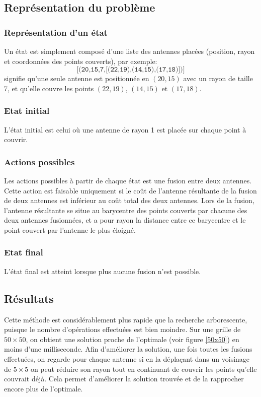 \documentclass[12pt]{article}
\begin{document}
\subsection{Représentation du problème}
\subsubsection{Représentation d'un état}
Un état est simplement composé d'une liste des antennes placées (position, rayon et coordonnées des points couverts), par exemple:
\begin{equation*}
	\texttt{[(20,15,7,[(22,19),(14,15),(17,18)])]}
\end{equation*}
signifie qu'une seule antenne est positionnée en $(20,15)$ avec un rayon de taille 7, et qu'elle couvre les points $(22,19)$, $(14,15)$ et $(17,18)$.


\subsubsection{Etat initial}
L'état initial est celui où une antenne de rayon 1 est placée sur chaque point à couvrir.

\subsubsection{Actions possibles}
Les actions possibles à partir de chaque état est une fusion entre deux antennes. Cette action est faisable uniquement si le coût de l'antenne résultante de la fusion de deux antennes est inférieur au coût total des deux antennes. Lors de la fusion, l'antenne résultante se situe au barycentre des points couverts par chacune des deux antennes fusionnées, et a pour rayon la distance entre ce barycentre et le point couvert par l'antenne le plus éloigné.

\subsubsection{Etat final}
L'état final est atteint lorsque plus aucune fusion n'est possible.


\subsection{Résultats}
Cette méthode est considérablement plus rapide que la recherche arborescente, puisque le nombre d'opérations effectuées est bien moindre. Sur une grille de $50 \times 50$, on obtient une solution proche de l'optimale (voir figure \ref{50x50}) en moins d'une milliseconde. Afin d'améliorer la solution, une fois toutes les fusions effectuées, on regarde pour chaque antenne si en la déplaçant dans un voisinage de $5 \times 5$ on peut réduire son rayon tout en continuant de couvrir les points qu'elle couvrait déjà. Cela permet d'améliorer la solution trouvée et de la rapprocher encore plus de l'optimale.
\end{document}
